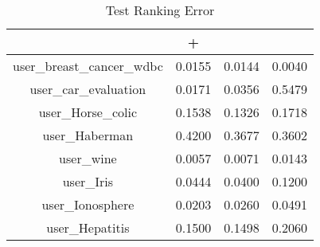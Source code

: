 \begin{table}[ht]\footnotesize
\centering
\caption{Test Ranking Error}
\label{Table:mil_test_error}
\begin{tabular}{|c|c|c|c|}
  \hline
          &\RB{}+  &  \CRB{}  &  \RB{}\\ 
  \hline
user_breast_cancer_wdbc  &  0.0155   &  0.0144   &  0.0040 \\ 
user_car_evaluation  &  0.0171   &  0.0356   &  0.5479 \\ 
user_Horse_colic  &  0.1538   &  0.1326   &  0.1718 \\ 
user_Haberman  &  0.4200   &  0.3677   &  0.3602 \\ 
user_wine  &  0.0057   &  0.0071   &  0.0143 \\ 
user_Iris  &  0.0444   &  0.0400   &  0.1200 \\ 
user_Ionosphere  &  0.0203   &  0.0260   &  0.0491 \\ 
user_Hepatitis  &  0.1500   &  0.1498   &  0.2060 \\ 
\hline
 \end{tabular}
  \end{table}


